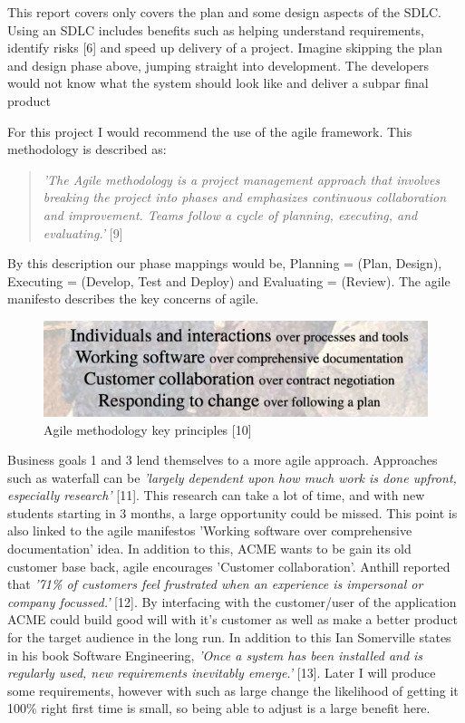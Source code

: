   This report covers only covers the plan and some design aspects of the SDLC. Using an SDLC includes benefits such as helping understand requirements,
  identify risks [6] and speed up delivery of a project. Imagine skipping the plan and design phase above, jumping straight into development. The developers
  would not know what the system should look like and deliver a subpar final product

  For this project I would recommend the use of the agile framework. This methodology is described as:
  \begin{quote}
    \textit{'The Agile methodology is a project management approach that involves breaking the project into phases and emphasizes continuous collaboration and 
    improvement. Teams follow a cycle of planning, executing, and evaluating.'} [9]
  \end{quote}

  By this description our phase mappings would be, Planning = (Plan, Design), Executing = (Develop, Test and Deploy) and Evaluating = (Review). The agile manifesto
  describes the key concerns of agile.

  \begin{figure}[H]
    \centering
    \includegraphics[width=12cm]{assets/agileManifesto.png}
    \caption{Agile methodology key principles [10]}
    \label{fig:agileManifesto}
  \end{figure}

  Business goals 1 and 3 lend themselves to a more agile approach. Approaches such as waterfall can be \textit{'largely dependent upon how much work is done 
  upfront, especially research'} [11]. This research can take a lot of time, and with new students starting in 3 months, a large opportunity could be missed.
  This point is also linked to the agile manifestos 'Working software over comprehensive documentation' idea. In addition to this, ACME wants to be gain its
  old customer base back, agile encourages 'Customer collaboration'. Anthill reported that  \textit{'71\% of customers feel frustrated when an experience is 
  impersonal or company focussed.'} [12]. By interfacing with the customer/user of the application ACME could build good will with it's customer as well as 
  make a better product for the target audience in the long run. In addition to this Ian Somerville states in his book Software Engineering,
  \textit{'Once a system has been installed and is regularly used, new requirements inevitably emerge.'} [13]. Later I will produce some requirements, however
  with such as large change the likelihood of getting it 100\% right first time is small, so being able to adjust is a large benefit here.
\newpage
